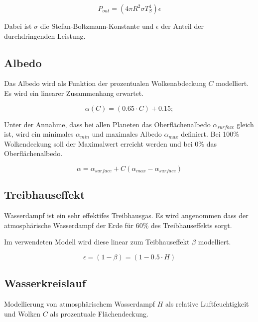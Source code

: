 \begin{refsection}
\begin{equation}
P_{out} = (4 \pi R^2 \sigma T_{S}^4)\epsilon
\end{equation}

Dabei ist $\sigma$ die Stefan-Boltzmann-Konstante und $\epsilon$ der Anteil der durchdringenden Leistung.

\subsection{Albedo}

Das Albedo wird als Funktion der prozentualen Wolkenabdeckung $C$ modelliert. Es wird ein linearer Zusammenhang erwartet.

\begin{equation}
\alpha(C) = (0.65 \cdot C) + 0.15;
\end{equation}


Unter der Annahme, dass bei allen Planeten das Oberflächenalbedo $\alpha_{surface}$ gleich ist, wird ein minimales $\alpha_{min}$ und maximales Albedo $\alpha_{max}$ definiert. Bei 100\% Wolkendeckung soll der Maximalwert erreicht werden und bei 0\% das Oberflächenalbedo.

\begin{equation}
\alpha = \alpha_{surface} + C(\alpha_{max} - \alpha_{surface})
\end{equation}

\subsection{Treibhauseffekt}

Wasserdampf ist ein sehr effektifes Treibhausgas. Es wird angenommen dass der atmosphärische Wasserdampf der Erde für 60\% des Treibhauseffekts sorgt.  


Im verwendeten Modell wird diese linear zum Teibhauseffekt $\beta$ modelliert.

\begin{equation}
\epsilon  = (1 - \beta) = (1 - 0.5 \cdot H)
\end{equation}

\subsection{Wasserkreislauf}

Modellierung von atmosphärischem Wasserdampf $H$ als relative Luftfeuchtigkeit und Wolken $C$ als prozentuale Flächendeckung.



\end{refsection}

